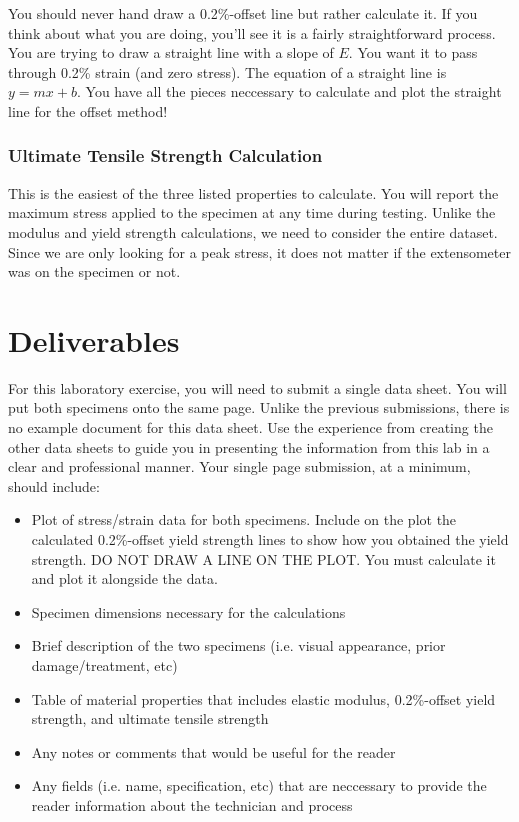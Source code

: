 \documentclass[12pt]{article}
\begin{document}
You should never hand draw a 0.2\%-offset line but rather calculate it. If you think about what you are doing, you'll see it is a fairly straightforward process. You are trying to draw a straight line with a slope of $E$. You want it to pass through 0.2\% strain (and zero stress). The equation of a straight line is $y=mx+b$. You have all the pieces neccessary to calculate and plot the straight line for the offset method!

\subsubsection{Ultimate Tensile Strength Calculation}
This is the easiest of the three listed properties to calculate. You will report the maximum stress applied to the specimen at any time during testing. Unlike the modulus and yield strength calculations, we need to consider the entire dataset. Since we are only looking for a peak stress, it does not matter if the extensometer was on the specimen or not.

\pagebreak
\section{Deliverables}
For this laboratory exercise, you will need to submit a single data sheet. You will put both specimens onto the same page. Unlike the previous submissions, there is no example document for this data sheet. Use the experience from creating the other data sheets to guide you in presenting the information from this lab in a clear and professional manner. Your single page submission, at a minimum, should include:
\begin{itemize}
    \item Plot of stress/strain data for both specimens. Include on the plot the calculated 0.2\%-offset yield strength lines to show how you obtained the yield strength. DO NOT DRAW A LINE ON THE PLOT. You must calculate it and plot it alongside the data.
    \item Specimen dimensions necessary for the calculations
    \item Brief description of the two specimens (i.e. visual appearance, prior damage/treatment, etc)
    \item Table of material properties that includes elastic modulus, 0.2\%-offset yield strength, and ultimate tensile strength
    \item Any notes or comments that would be useful for the reader
    \item Any fields (i.e. name, specification, etc) that are neccessary to provide the reader information about the technician and process
\end{itemize}
\end{document}
